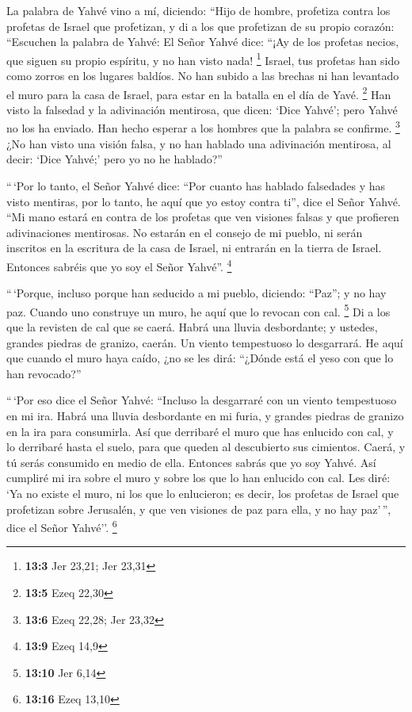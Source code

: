 \begin{paracol}{2}
 La palabra de Yahvé vino a mí, diciendo: 
``Hijo de hombre, profetiza contra los profetas de Israel que
profetizan, y di a los que profetizan de su propio corazón: ``Escuchen
la palabra de Yahvé:  El Señor Yahvé dice: ``¡Ay de los
profetas necios, que siguen su propio espíritu, y no han visto nada!
\footnote{\textbf{13:3} Jer 23,21; Jer 23,31}  Israel, tus
profetas han sido como zorros en los lugares baldíos.  No
han subido a las brechas ni han levantado el muro para la casa de
Israel, para estar en la batalla en el día de Yavé. \footnote{\textbf{13:5}
  Ezeq 22,30}  Han visto la falsedad y la adivinación
mentirosa, que dicen: `Dice Yahvé'; pero Yahvé no los ha enviado. Han
hecho esperar a los hombres que la palabra se confirme. \footnote{\textbf{13:6}
  Ezeq 22,28; Jer 23,32}  ¿No han visto una visión falsa,
y no han hablado una adivinación mentirosa, al decir: `Dice Yahvé;' pero
yo no he hablado?''

 ``\,`Por lo tanto, el Señor Yahvé dice: ``Por cuanto has
hablado falsedades y has visto mentiras, por lo tanto, he aquí que yo
estoy contra ti'', dice el Señor Yahvé.  ``Mi mano estará
en contra de los profetas que ven visiones falsas y que profieren
adivinaciones mentirosas. No estarán en el consejo de mi pueblo, ni
serán inscritos en la escritura de la casa de Israel, ni entrarán en la
tierra de Israel. Entonces sabréis que yo soy el Señor Yahvé''.
\footnote{\textbf{13:9} Ezeq 14,9}

 ``\,`Porque, incluso porque han seducido a mi pueblo,
diciendo: ``Paz''; y no hay paz. Cuando uno construye un muro, he aquí
que lo revocan con cal. \footnote{\textbf{13:10} Jer 6,14}
 Di a los que la revisten de cal que se caerá. Habrá una
lluvia desbordante; y ustedes, grandes piedras de granizo, caerán. Un
viento tempestuoso lo desgarrará.  He aquí que cuando el
muro haya caído, ¿no se les dirá: ``¿Dónde está el yeso con que lo han
revocado?''

 ``\,`Por eso dice el Señor Yahvé: ``Incluso la
desgarraré con un viento tempestuoso en mi ira. Habrá una lluvia
desbordante en mi furia, y grandes piedras de granizo en la ira para
consumirla.  Así que derribaré el muro que has enlucido
con cal, y lo derribaré hasta el suelo, para que queden al descubierto
sus cimientos. Caerá, y tú serás consumido en medio de ella. Entonces
sabrás que yo soy Yahvé.  Así cumpliré mi ira sobre el
muro y sobre los que lo han enlucido con cal. Les diré: `Ya no existe el
muro, ni los que lo enlucieron;  es decir, los profetas
de Israel que profetizan sobre Jerusalén, y que ven visiones de paz para
ella, y no hay paz'\,'', dice el Señor Yahvé''. \footnote{\textbf{13:16}
  Ezeq 13,10}


\end{paracol}
